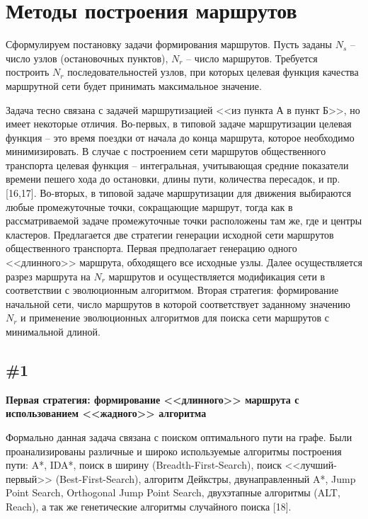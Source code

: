 \chapter{Методы построения маршрутов}

Сформулируем постановку задачи формирования маршрутов. Пусть заданы \( N_s \) – число узлов (остановочных 
пунктов), \( N_r \) – число маршрутов. Требуется построить \( N_r \) последовательностей узлов, при которых 
целевая функция качества маршрутной сети будет принимать максимальное значение. 

Задача тесно связана с задачей маршрутизацией <<из пункта А в пункт Б>>, но имеет некоторые отличия. 
Во-первых, в типовой задаче маршрутизации целевая функция – это время поездки от начала до конца маршрута, 
которое необходимо минимизировать. В случае с построением сети маршрутов общественного транспорта целевая 
функция -- интегральная, учитывающая средние показатели времени пешего хода до остановки, длины пути, 
количества пересадок, и пр. [16,17]. Во-вторых, в типовой задаче маршрутизации для движения выбираются 
любые промежуточные точки, сокращающие маршрут, тогда как в рассматриваемой задаче промежуточные точки 
расположены там же, где и центры кластеров.
Предлагается две стратегии генерации исходной сети маршрутов общественного транспорта. Первая предполагает 
генерацию одного <<длинного>> маршрута, обходящего все исходные узлы. Далее осуществляется разрез маршрута 
на \( N_r \) маршрутов и осуществляется модификация сети в соответствии с эволюционным алгоритмом. Вторая 
стратегия: формирование начальной сети, число маршрутов в которой соответствует заданному значению \( N_r \) 
и применение эволюционных алгоритмов для поиска сети маршрутов с минимальной длиной.

\section{\#1}

\textbf{Первая стратегия: формирование <<длинного>> маршрута с использованием <<жадного>> алгоритма}

Формально данная задача связана с поиском оптимального пути на графе. Были проанализированы различные и 
широко используемые алгоритмы построения пути: A*, IDA*, поиск в ширину (Breadth-First-Search), поиск 
<<лучший-первый>> (Best-First-Search), алгоритм Дейкстры, двунаправленный A*, Jump Point Search, 
Orthogonal Jump Point Search, двухэтапные алгоритмы (ALT, Reach), а так же генетические алгоритмы 
случайного поиска [18]. 

